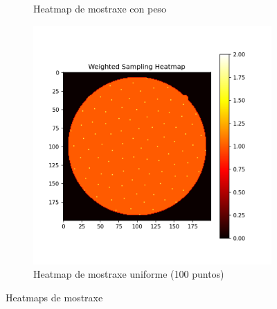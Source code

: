 \begin{figure}[]
\begin{subfigure}[b]{0.3\textwidth}
        \caption{Heatmap de mostraxe con peso}
        \label{fig:weighted_sampling_heatmap}
    \end{subfigure}
    \hfill
    \begin{subfigure}[b]{0.3\textwidth}
        \centering
        \includegraphics[width=\textwidth]{imaxes/uniform_sampling_heatmap.png}
        \caption{Heatmap de mostraxe uniforme (100 puntos)}
        \label{fig:uniform_sampling_heatmap}
    \end{subfigure}
    \caption{Heatmaps de mostraxe}
    \label{fig:sampling_heatmaps}
\end{figure}

